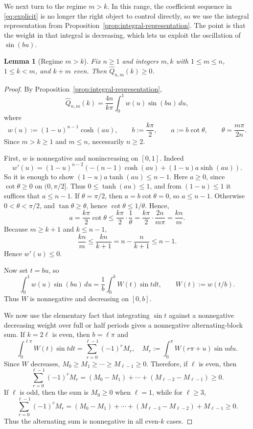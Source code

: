 \documentclass[10pt,a4paper]{amsart}
\newtheorem{lemma}[theorem]{Lemma}
\begin{document}
We next turn to the regime $m > k$. In this range, the coefficient sequence in \eqref{eq:explicit} is no longer the right object to control directly, so we use the integral representation from Proposition~\ref{prop:integral-representation}. The point is that the weight in that integral is decreasing, which lets us exploit the oscillation of $\sin(bu)$.

\begin{lemma}[Regime $m>k$]\label{lem:m-gt-k}
Fix $n\ge1$ and integers $m,k$ with $1\le m\le n$, $1\le k<m$, and $k+m$ even.
Then $\widehat Q_{n,m}(k)\ge0$.
\end{lemma}

\begin{proof}
By Proposition~\ref{prop:integral-representation},
\[
\widehat Q_{n,m}(k)=\frac{4n}{k\pi}\int_0^1 w(u)\sin(bu)\,du,
\]
where
\[
w(u):=(1-u)^{n-1}\cosh(au),\qquad
b:=\frac{k\pi}{2},\qquad
a:=b\cot\theta, \qquad \theta=\frac{m\pi}{2n}.
\]
Since $m>k\ge1$ and $m\le n$, necessarily $n\ge2$.

First, $w$ is nonnegative and nonincreasing on $[0,1]$.
Indeed
\[
w'(u)=(1-u)^{n-2}\!\left(-(n-1)\cosh(au)+(1-u)a\sinh(au)\right).
\]
So it is enough to show $(1-u)a\tanh(au)\le n-1$. Here $a \ge 0$, since $\cot\theta \ge 0$ on $(0,\pi/2]$. Thus $0\le\tanh(au)\le1$, and from $(1-u) \le 1$ it suffices that $a\le n-1$. If \(\theta=\pi/2\), then \(a = b\cot\theta =0\), so \(a\le n-1\). Otherwise \(0< \theta < \pi/2\), and \(\tan\theta\ge \theta\), hence \(\cot\theta\le 1/\theta\). Hence,
\[
a=\frac{k\pi}{2}\cot\theta\le \frac{k\pi}{2}\cdot\frac1\theta
=\frac{k\pi}{2}\cdot\frac{2n}{m\pi}=\frac{kn}{m}.
\]
Because $m\ge k+1$ and $k\le n-1$,
\[
\frac{kn}{m}\le\frac{kn}{k+1}=n-\frac{n}{k+1}\le n-1.
\]
Hence $w'(u)\le0$.

Now set $t=bu$, so
\[
\int_0^1 w(u)\sin(bu)\,du
=\frac1b\int_0^b W(t)\sin t dt,\qquad W(t):=w(t/b).
\]
Thus $W$ is nonnegative and decreasing on $[0,b]$.

We now use the elementary fact that integrating $\sin t$ against a nonnegative decreasing weight over full or half periods gives a nonnegative alternating-block sum. If $k = 2\ell$ is even, then $b = \ell\pi$ and
\[
\int_0^{\ell\pi}W(t)\sin t dt
= \sum_{r=0}^{\ell-1}(-1)^rM_r,\quad
M_r:= \int_0^\pi W(r\pi+u) \sin u du.
\]
Since $W$ decreases, $M_0 \ge M_1\ge\cdots\ge M_{\ell-1} \ge 0$. Therefore, if $\ell$ is even, then 
\[ 
\sum_{r=0}^{\ell-1}(-1)^rM_r = (M_0-M_1) + \cdots + (M_{\ell-2}-M_{\ell-1}) \ge 0.
\]
If $\ell$ is odd, then the sum is $M_0 \ge 0$ when $\ell=1$, while for $\ell\ge3$,
\[
\sum_{r=0}^{\ell-1}(-1)^rM_r
= (M_0-M_1) + \cdots + (M_{\ell-3}-M_{\ell-2})+M_{\ell-1} \ge 0.
\]
Thus the alternating sum is nonnegative in all even-$k$ cases.



\end{proof}
\end{document}
